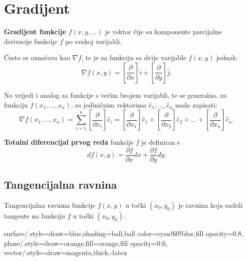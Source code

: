 
\section{Gradijent}

\textbf{Gradijent funkcije} $f(x,y,\dots)$ je vektor čije su komponente
parcijalne derivacije funkcije $f$ po svakoj varijabli.

Često se označava kao $\nabla f$, te je za funkciju sa dvije varijable $f(x,y)$ jednak:
$$
  \nabla f(x,y) = \left[\frac{\partial}{\partial x}\right]\hat{i} + \left[\frac{\partial}{\partial y}\right]\hat{j}.
$$

No vrijedi i analog za funkcije s večim brojem varijabli, te se generalno, za
funkciju $f(x_1, \dots, x_n)$, sa jediničnim vektorima
$\hat{e}_1,\dots,\hat{e}_n$ može zapisati:
$$
  \nabla f(x_1, \dots, x_n) = \sum_{i=1}^n \left[\frac{\partial}{\partial x_i}\right]\hat{e}_i = \left[\frac{\partial}{\partial x_1}\right]\hat{e}_1 + \left[\frac{\partial}{\partial x_2}\right]\hat{e}_2 + \dots + \left[\frac{\partial}{\partial x_n}\right]\hat{e}_n.
$$

\textbf{Totalni diferencijal prvog reda} funkcije $f$ je definiran s
$$
df(x,y) = \frac{\partial f}{\partial x}dx + \frac{\partial f}{\partial y}dy.
$$

\subsection{Tangencijalna ravnina}

Tangencijalna ravnina funkcije $f(x,y)$ u točki $(x_0, y_0)$ je ravnina koja
sadrži tangente na funkciju $f$ u točki $(x_0, y_0)$.

\tikzset
{ surface/.style={draw=blue,shading=ball,ball color=cyan!60!blue,fill
  opacity=0.8}, plane/.style={draw=orange,fill=orange,fill opacity=0.6},
  vector/.style={draw=magenta,thick,-latex} }

